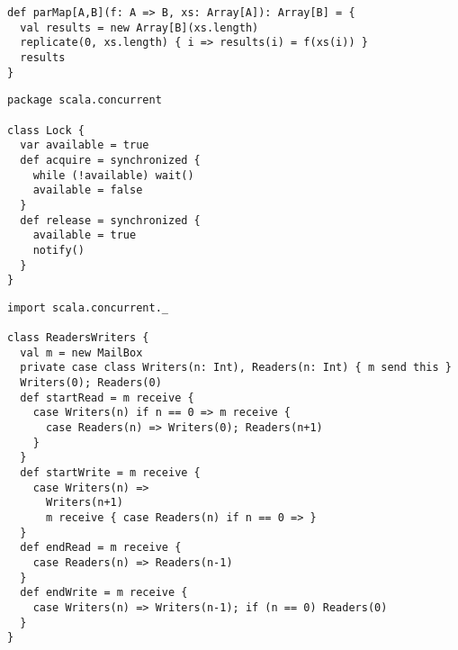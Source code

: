 
\begin{lstlisting}
def parMap[A,B](f: A => B, xs: Array[A]): Array[B] = {
  val results = new Array[B](xs.length)
  replicate(0, xs.length) { i => results(i) = f(xs(i)) }
  results
}
\end{lstlisting}



\begin{lstlisting}
package scala.concurrent

class Lock {
  var available = true
  def acquire = synchronized {
    while (!available) wait()
    available = false
  }
  def release = synchronized {
    available = true
    notify()
  }
}
\end{lstlisting}



\begin{lstlisting}
import scala.concurrent._

class ReadersWriters {
  val m = new MailBox
  private case class Writers(n: Int), Readers(n: Int) { m send this }
  Writers(0); Readers(0)
  def startRead = m receive {
    case Writers(n) if n == 0 => m receive {
      case Readers(n) => Writers(0); Readers(n+1)
    }
  }
  def startWrite = m receive {
    case Writers(n) =>
      Writers(n+1)
      m receive { case Readers(n) if n == 0 => }
  }
  def endRead = m receive {
    case Readers(n) => Readers(n-1)
  }
  def endWrite = m receive {
    case Writers(n) => Writers(n-1); if (n == 0) Readers(0)
  }
}
\end{lstlisting}

